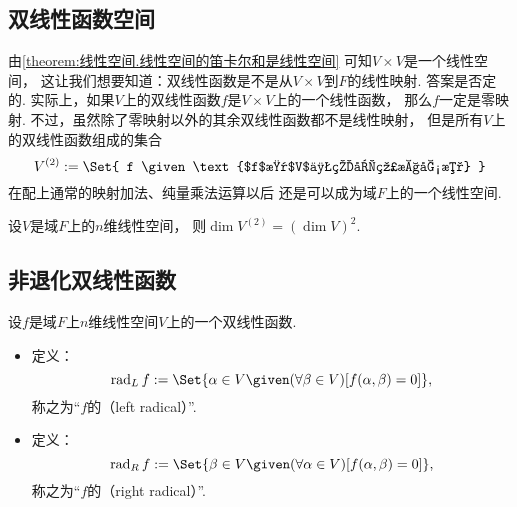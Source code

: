 \subsection{双线性函数空间}
由\cref{theorem:线性空间.线性空间的笛卡尔和是线性空间}
可知\(V \times V\)是一个线性空间，
这让我们想要知道：双线性函数是不是从\(V \times V\)到\(F\)的线性映射.
答案是否定的.
实际上，如果\(V\)上的双线性函数\(f\)是\(V \times V\)上的一个线性函数，
那么\(f\)一定是零映射.
不过，虽然除了零映射以外的其余双线性函数都不是线性映射，
但是所有\(V\)上的双线性函数组成的集合\begin{equation}
	V^{(2)}
	\defeq
	\Set{
		f
		\given
		\text{$f$是$V$上的双线性函数}
	}
\end{equation}
在配上通常的映射加法、纯量乘法运算以后
还是可以成为域\(F\)上的一个线性空间.

\begin{proposition}
设\(V\)是域\(F\)上的\(n\)维线性空间，
则\(\dim V^{(2)} = (\dim V)^2\).
\end{proposition}

\subsection{非退化双线性函数}
\begin{definition}
设\(f\)是域\(F\)上\(n\)维线性空间\(V\)上的一个双线性函数.
\begin{itemize}
	\item 定义：\begin{equation}
		\Rad_L f
		\defeq
		\Set{
			\alpha \in V
			\given
			(\forall\beta \in V)
			[f(\alpha,\beta) = 0]
		},
	\end{equation}
	称之为“\(f\)的（left radical）”.
	\item 定义：\begin{equation}
		\Rad_R f
		\defeq
		\Set{
			\beta \in V
			\given
			(\forall\alpha \in V)
			[f(\alpha,\beta) = 0]
		},
	\end{equation}
	称之为“\(f\)的（right radical）”.
\end{itemize}
\end{definition}

